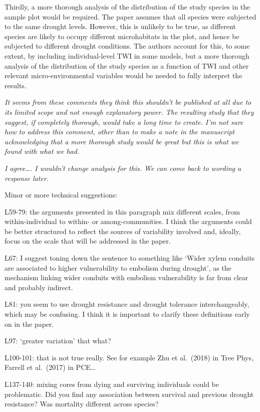 \documentclass[
]{article}
\begin{document}
Thirdly, a more thorough analysis of the distribution of the study
species in the sample plot would be required. The paper assumes that all
species were subjected to the same drought levels. However, this is
unlikely to be true, as different species are likely to occupy different
microhabitats in the plot, and hence be subjected to different drought
conditions. The authors account for this, to some extent, by including
individual-level TWI in some models, but a more thorough analysis of the
distribution of the study species as a function of TWI and other
relevant micro-environmental variables would be needed to fully
interpret the results.

\emph{It seems from these comments they think this shouldn't be
published at all due to its limited scope and not enough explanatory
power. The resulting study that they suggest, if completely thorough,
would take a long time to create. I'm not sure how to address this
comment, other than to make a note in the manuscript acknowledging that
a more thorough study would be great but this is what we found with what
we had.}

\emph{I agree\ldots. I wouldn't change analysis for this. We can come
back to wording a response later.}

Minor or more technical suggestions:

L59-79: the arguments presented in this paragraph mix different scales,
from within-individual to within- or among-communities. I think the
arguments could be better structured to reflect the sources of
variability involved and, ideally, focus on the scale that will be
addressed in the paper.

L67: I suggest toning down the sentence to something like `Wider xylem
conduits are associated to higher vulnerability to embolism during
drought', as the mechanism linking wider conduits with embolism
vulnerability is far from clear and probably indirect.

L81: you seem to use drought resistance and drought tolerance
interchangeably, which may be confusing. I think it is important to
clarify these definitions early on in the paper.

L97: `greater variation' that what?

L100-101: that is not true really. See for example Zhu et al.~(2018) in
Tree Phys, Farrell et al.~(2017) in PCE\ldots{}

L137-140: mixing cores from dying and surviving individuals could be
problematic. Did you find any association between survival and previous
drought resistance? Was mortality different across species?
\end{document}
